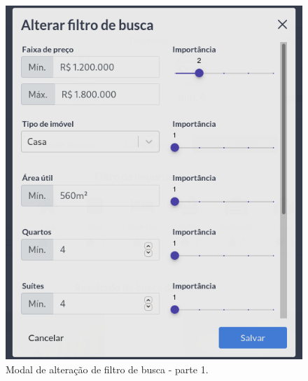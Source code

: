 \begin{figure}[H]
    \centering
    \includegraphics[scale=0.35]{figuras/desenvolvimento/componente_filtro3.png}
    \caption[Modal de alteração de filtro de busca - parte 1]{Modal de alteração de filtro de busca - parte 1.}
    \label{fig:componente_filtro3}
\end{figure}

